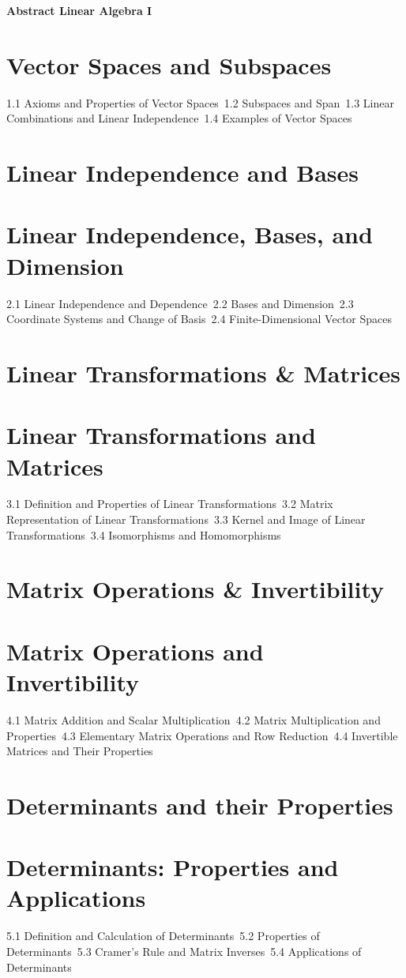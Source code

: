 {\LARGE \bf{Abstract Linear Algebra I}}
\section{Vector Spaces and Subspaces}
1.1 Axioms and Properties of Vector Spaces\
1.2 Subspaces and Span\
1.3 Linear Combinations and Linear Independence\
1.4 Examples of Vector Spaces\
\section{Linear Independence and Bases}
\section{Linear Independence, Bases, and Dimension}
2.1 Linear Independence and Dependence\
2.2 Bases and Dimension\
2.3 Coordinate Systems and Change of Basis\
2.4 Finite-Dimensional Vector Spaces\
\section{Linear Transformations \& Matrices}
\section{Linear Transformations and Matrices}
3.1 Definition and Properties of Linear Transformations\
3.2 Matrix Representation of Linear Transformations\
3.3 Kernel and Image of Linear Transformations\
3.4 Isomorphisms and Homomorphisms\
\section{Matrix Operations \& Invertibility}
\section{Matrix Operations and Invertibility}
4.1 Matrix Addition and Scalar Multiplication\
4.2 Matrix Multiplication and Properties\
4.3 Elementary Matrix Operations and Row Reduction\
4.4 Invertible Matrices and Their Properties\
\section{Determinants and their Properties}
\section{Determinants: Properties and Applications}
5.1 Definition and Calculation of Determinants\
5.2 Properties of Determinants\
5.3 Cramer's Rule and Matrix Inverses\
5.4 Applications of Determinants\
